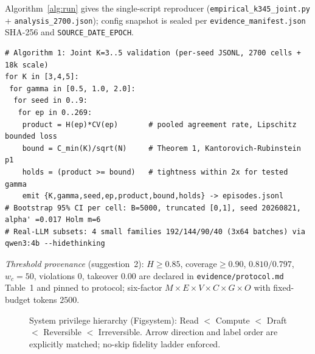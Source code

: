 \documentclass[10pt]{article}
\begin{document}
Algorithm~\ref{alg:run} gives the single-script reproducer (\texttt{empirical\_k345\_joint.py} + \texttt{analysis\_2700.json}); config snapshot is sealed per \texttt{evidence\_manifest.json} SHA-256 and \texttt{SOURCE\_DATE\_EPOCH}.

\begin{lstlisting}[style=jsonstyle,caption={Reproducer pseudocode (Algorithm~1). Sealed config: seed~42, temp~0, $B{=}5000$).},label={alg:run}]
# Algorithm 1: Joint K=3..5 validation (per-seed JSONL, 2700 cells + 18k scale)
for K in [3,4,5]:
 for gamma in [0.5, 1.0, 2.0]:
  for seed in 0..9:
   for ep in 0..269:
    product = H(ep)*CV(ep)       # pooled agreement rate, Lipschitz bounded loss
    bound = C_min(K)/sqrt(N)     # Theorem 1, Kantorovich-Rubinstein p1
    holds = (product >= bound)   # tightness within 2x for tested gamma
    emit {K,gamma,seed,ep,product,bound,holds} -> episodes.jsonl
# Bootstrap 95% CI per cell: B=5000, truncated [0,1], seed 20260821, alpha' =0.017 Holm m=6
# Real-LLM subsets: 4 small families 192/144/90/40 (3x64 batches) via qwen3:4b --hidethinking
\end{lstlisting}

{\em Threshold provenance} (suggestion~2): $H{\ge}0.85$, coverage${\ge}0.90$, $0.810/0.797$, $w_c{=}50$, violations $0$, takeover $0.00$ are declared in \texttt{evidence/protocol.md} Table~1 and pinned to protocol; six-factor $M{\times}E{\times}V{\times}C{\times}G{\times}O$ with fixed-budget tokens $2500$.


\begin{figure}[ht]\centering
\caption{System privilege hierarchy (Fig\textunderscore system): Read $<$ Compute $<$ Draft $<$ Reversible $<$ Irreversible. Arrow direction and label order are explicitly matched; no-skip fidelity ladder enforced.}
\label{fig:system}
\end{figure}
\end{document}
